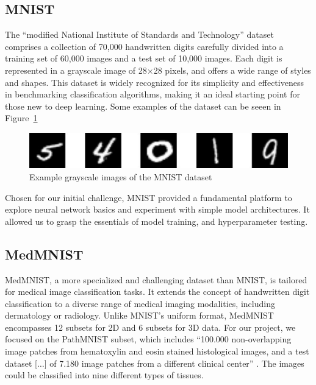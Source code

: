 \subsection{MNIST}\label{mnist}
The ``modified National Institute of Standards and Technology'' dataset comprises a collection of 70,000 handwritten digits carefully divided into a training set of 60,000 images and a test set of 10,000 images. Each digit is represented in a grayscale image of 28$\times$28 pixels, and offers a wide range of styles and shapes. This dataset is widely recognized for its simplicity and effectiveness in benchmarking classification algorithms, making it an ideal starting point for those new to deep learning. Some examples of the dataset can be seeen in Figure~\ref{fig:MNIST}

\begin{figure}
    \centering
    \includegraphics[width=1\textwidth]{figures/MNIST.png}
    \caption{Example grayscale images of the MNIST dataset}\label{fig:MNIST}
\end{figure}

Chosen for our initial challenge, MNIST provided a fundamental platform to explore neural network basics and experiment with simple model architectures. It allowed us to grasp the essentials of model training, and hyperparameter testing.


\subsection{MedMNIST}\label{medmnist}

MedMNIST, a more specialized and challenging dataset than MNIST, is tailored for medical image classification tasks. It extends the concept of handwritten digit classification to a diverse range of medical imaging modalities, including dermatology or radiology. Unlike MNIST's uniform format, MedMNIST encompasses 12 subsets for 2D and 6 subsets for 3D data. For our project, we focused on the PathMNIST \citep{kather2018, kather2019} subset, which includes ``100.000 non-overlapping image patches from hematoxylin and eosin stained histological images, and a test dataset [$\ldots$] of 7.180 image patches from a different clinical center'' \citep{medmnistv1}. The images could be classified into nine different types of tissues.

